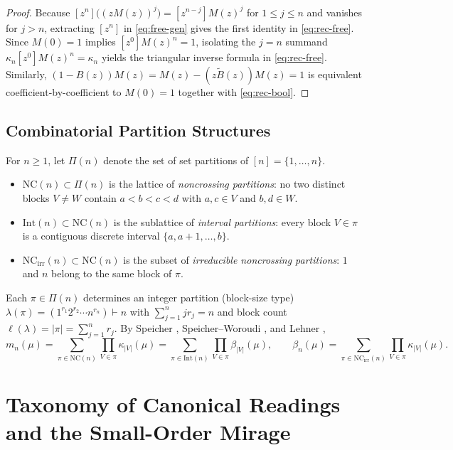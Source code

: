 \documentclass[11pt,a4paper]{article}
\theoremstyle{definition}
\theoremstyle{remark}
\newcommand{\NC}{\mathrm{NC}}
\newcommand{\NCirr}{\mathrm{NC}_{\mathrm{irr}}}
\newcommand{\IntP}{\mathrm{Int}}
\begin{document}
\begin{proof}
Because $[z^n]\bigl((z M(z))^j\bigr) = [z^{n-j}] M(z)^j$ for $1 \le j \le n$ and vanishes for $j > n$, extracting $[z^n]$ in \eqref{eq:free-gen} gives the first identity in \eqref{eq:rec-free}. Since $M(0) = 1$ implies $[z^0] M(z)^n = 1$, isolating the $j = n$ summand $\kappa_n [z^0] M(z)^n = \kappa_n$ yields the triangular inverse formula in \eqref{eq:rec-free}. Similarly, $(1 - B(z)) M(z) = M(z) - (z \tilde{B}(z)) M(z) = 1$ is equivalent coefficient-by-coefficient to $M(0) = 1$ together with \eqref{eq:rec-bool}.
\end{proof}

\subsection{Combinatorial Partition Structures}
For $n \ge 1$, let $\Pi(n)$ denote the set of set partitions of $[n] = \{1, \dots, n\}$.
\begin{itemize}
  \item $\NC(n) \subset \Pi(n)$ is the lattice of \emph{noncrossing partitions}: no two distinct blocks $V \ne W$ contain $a < b < c < d$ with $a, c \in V$ and $b, d \in W$.
  \item $\IntP(n) \subset \NC(n)$ is the sublattice of \emph{interval partitions}: every block $V \in \pi$ is a contiguous discrete interval $\{a, a+1, \dots, b\}$.
  \item $\NCirr(n) \subset \NC(n)$ is the subset of \emph{irreducible noncrossing partitions}: $1$ and $n$ belong to the same block of $\pi$.
\end{itemize}
Each $\pi \in \Pi(n)$ determines an integer partition (block-size type) $\lambda(\pi) = (1^{r_1} 2^{r_2} \cdots n^{r_n}) \vdash n$ with $\sum_{j=1}^n j r_j = n$ and block count $\ell(\lambda) = |\pi| = \sum_{j=1}^n r_j$. By Speicher \cite{Speicher1994}, Speicher--Woroudi \cite{SpeicherWoroudi1997}, and Lehner \cite{Lehner2002},
\begin{equation}\label{eq:comb-expansions}
  m_n(\mu) = \sum_{\pi \in \NC(n)} \prod_{V \in \pi} \kappa_{|V|}(\mu) = \sum_{\pi \in \IntP(n)} \prod_{V \in \pi} \beta_{|V|}(\mu), \qquad
  \beta_n(\mu) = \sum_{\pi \in \NCirr(n)} \prod_{V \in \pi} \kappa_{|V|}(\mu).
\end{equation}

\section{Taxonomy of Canonical Readings and the Small-Order Mirage}
\end{document}
